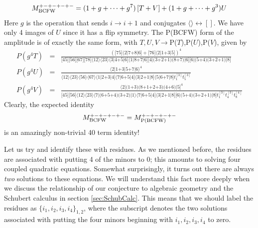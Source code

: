 \documentclass[12pt]{article}
\newcommand{\nn}{\nonumber}
\newcommand{\be}{\begin{eqnarray}}
\newcommand{\ee}{\end{eqnarray}}
\begin{document}
\be
M^{+-+-+-+-}_{{\rm BCFW}} = (1 + g + \cdots + g^7)\left[T + V\right] + (1 + g + \cdots + g^3) U
\ee
Here $g$ is the operation that sends $i \to i+1$ and conjugates $\langle \rangle \leftrightarrow []$.
We have only 4 images of $U$ since it has a flip symmetry.
The P(BCFW) form of the amplitude is of exactly the same form, with $T,U,V \to$P($T$),P($U$),P($V$), given by
\be
P(g^4T)\!\!\! &=&\!\!\! \frac{(\text{[75]} \text{$\langle
   $2$|$7+8$|$6]}+\text{[76]} \text{$\langle
   $2$|$1+3$|$5]})^4}{\text{[45]} \text{[56]} \text{[67]}
   \text{[78]} \text{$\langle $12$\rangle $} \text{$\langle
   $23$\rangle $} \text{$\langle $3$|$4+5$|$6]}
   \text{$\langle $1$|$8+7$|$6]} \text{$[
   $4$|$(3+2+1)$$(8+7)$|$6$] $} \text{$[
   $6$|$(5+4)$$(3+2+1)$|$8$] $}} \nn \\
P(g^4U)\!\!\! &=&\!\!\! \frac{\text{$\langle $2$|$1+3$|$5+7$|$6$\rangle
   $}^4}{\text{$\langle $12$\rangle $} \text{$\langle
   $23$\rangle $} \text{$\langle $56$\rangle
   $} \text{$\langle $67$\rangle $}\text{$\langle $1$|$2+3$|$4]}
   \text{$\langle $7$|$6+5$|$4]}  \text{$\langle
   $3$|$2+1$|$8]} \text{$\langle $5$|$6+7$|$8]}
   t_1^{[3]} t_5^{[3]} } \nn \\
P(g^4V)\!\!\! &=&\!\!\! \frac{\text{$\langle
   $2$|$(1+3)$$(8+1+2+3)$$(4+6)$|$5]}^4}{\text{[45]} \text{[56]} \text{$\langle
   $12$\rangle $} \text{$\langle $23$\rangle $}\langle\text{7$|$(6+5+4)$$(3+2)$|$1}\rangle
   \text{$\langle $7$|$6+5$|$4]} \text{$\langle
   $3$|$2+1$|$8]} \text{$[
   $6$|$(5+4)$$(3+2+1)$|$8$] $} t_1^{[3]}t_4^{[3]}t_8^{[4]}
} \nn
\ee
Clearly, the expected identity
\be
M^{+-+-+-+-}_{{\rm BCFW}} = M^{+-+-+-+-}_{{\rm P(BCFW)}}
\ee
is an amazingly non-trivial 40 term identity!

Let us try and identify these with residues. As we mentioned before, the residues are associated with putting 4 of the minors to 0; this amounts to solving four coupled quadratic equations. Somewhat surprisingly, it turns out there are always {\it two} solutions to these equations. We will understand this fact more deeply when we discuss the relationship of our conjecture to algebraic geometry and the Schubert calculus in section \ref{sec:SchubCalc}. This means that we should label the residues as $\{i_1,i_2,i_3,i_4\}_{1,2}$, where the subscript denotes the two solutions associated with putting the four minors beginning with $i_1,i_2,i_3,i_4$ to zero.
\end{document}
